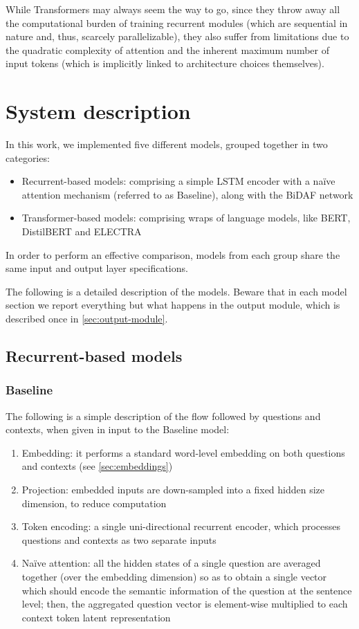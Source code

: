 \documentclass[a4paper,10pt]{report}
\begin{document}
While Transformers may always seem the way to go, since they throw away all the computational burden of training recurrent modules (which are sequential in nature and, thus, scarcely parallelizable), they also suffer from limitations due to the quadratic complexity of attention and the inherent maximum number of input tokens (which is implicitly linked to architecture choices themselves).


\chapter{System description}\label{chap:system-description}

In this work, we implemented five different models, grouped together in two categories:
\begin{itemize}
  \item Recurrent-based models: comprising a simple LSTM encoder with a naïve attention mechanism (referred to as Baseline), along with the BiDAF network
  \item Transformer-based models: comprising wraps of language models, like BERT, DistilBERT and ELECTRA
\end{itemize}

In order to perform an effective comparison, models from each group share the same input and output layer specifications.

The following is a detailed description of the models. Beware that in each model section we report everything but what happens in the output module, which is described once in \ref{sec:output-module}.

\section{Recurrent-based models}\label{sec:recurrent-models}
\subsection{Baseline}\label{subsec:baseline}

The following is a simple description of the flow followed by questions and contexts, when given in input to the Baseline model:
\begin{enumerate}
  \item Embedding: it performs a standard word-level embedding on both questions and contexts (see \ref{sec:embeddings})
  \item Projection: embedded inputs are down-sampled into a fixed hidden size dimension, to reduce computation
  \item Token encoding: a single uni-directional recurrent encoder, which processes questions and contexts as two separate inputs
  \item Naïve attention: all the hidden states of a single question are averaged together (over the embedding dimension) so as to obtain a single vector which should encode the semantic information of the question at the sentence level; then, the aggregated question vector is element-wise multiplied to each context token latent representation
\end{enumerate}
\end{document}
